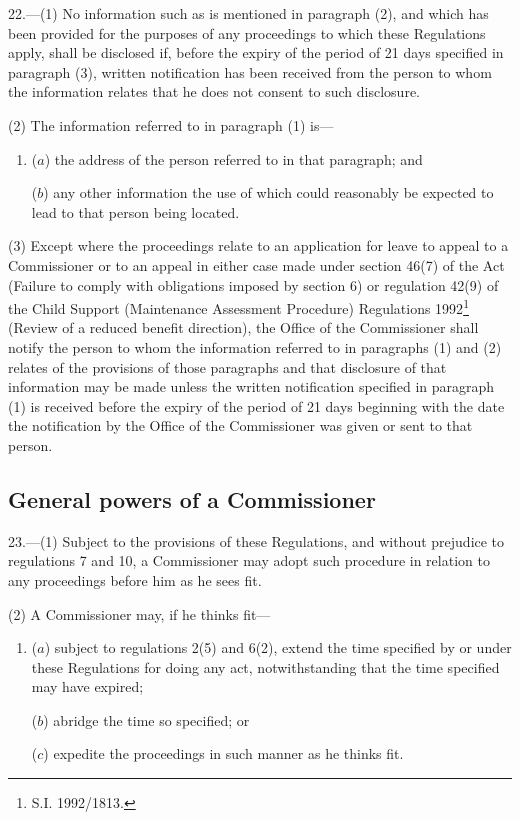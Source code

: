 \documentclass[12pt,a4paper]{article}
\begin{document}
22.—(1) No information such as is mentioned in paragraph (2), and which has been provided for the purposes of any proceedings to which these Regulations apply, shall be disclosed if, before the expiry of the period of 21 days specified in paragraph (3), written notification has been received from the person to whom the information relates that he does not consent to such disclosure.

(2) The information referred to in paragraph (1) is—
\begin{enumerate}\item[]
($a$) the address of the person referred to in that paragraph; and

($b$) any other information the use of which could reasonably be expected to lead to that person being located.
\end{enumerate}

(3) Except where the proceedings relate to an application for leave to appeal to a Commissioner or to an appeal in either case made under section 46(7) of the Act (Failure to comply with obligations imposed by section 6) or regulation 42(9) of the Child Support (Maintenance Assessment Procedure) Regulations 1992\footnote{\frenchspacing S.I. 1992/1813.} (Review of a reduced benefit direction), the Office of the Commissioner shall notify the person to whom the information referred to in paragraphs (1) and (2) relates of the provisions of those paragraphs and that disclosure of that information may be made unless the written notification specified in paragraph (1) is received before the expiry of the period of 21 days beginning with the date the notification by the Office of the Commissioner was given or sent to that person.


\subsection[23. General powers of a Commissioner]{General powers of a Commissioner}

23.—(1) Subject to the provisions of these Regulations, and without prejudice to regulations 7 and 10, a Commissioner may adopt such procedure in relation to any proceedings before him as he sees fit.

(2) A Commissioner may, if he thinks fit—
\begin{enumerate}\item[]
($a$) subject to regulations 2(5) and 6(2), extend the time specified by or under these Regulations for doing any act, notwithstanding that the time specified may have expired;

($b$) abridge the time so specified; or

($c$) expedite the proceedings in such manner as he thinks fit.
\end{enumerate}
\end{document}
